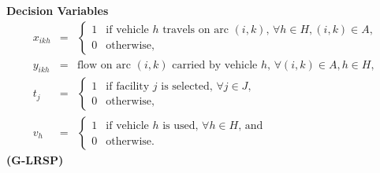\documentclass[11pt]{article}
\begin{document}
{\bf Decision Variables}
\begin{eqnarray*}
x_{ikh} & = & \left\{ \begin{array}{ll}
                 1  & \mbox{if vehicle $h$ travels on arc $(i,k)$, $\forall h \in H, (i,k) \in A$,} \\
                 0  & \mbox{otherwise,}                                                  
                \end{array} 
              \right. \\
y_{ikh} & = & \mbox{flow on arc $(i,k)$ carried by vehicle $h$, $\forall (i,k) \in A, h \in H$,} \\
t_{j} & = & \left\{ \begin{array}{ll}
                 1  & \mbox{if facility $j$ is selected, $\forall j \in J$,}\\
                 0  & \mbox{otherwise,}                                                  
                \end{array}  
              \right. \\
v_h & = &\left \{ \begin{array}{ll}
                 1  & \mbox{if vehicle $h$ is used, $\forall h \in H$, and}\\
                 0  & \mbox{otherwise.}                                                  
                \end{array}  \right. 
\end{eqnarray*}
{\bf (G-LRSP)} 
\end{document}
